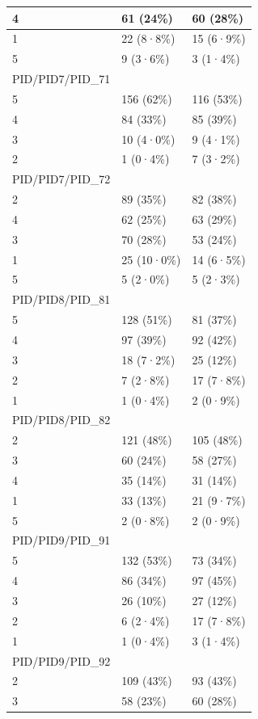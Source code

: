 \documentclass[
]{book}
\begin{document}
\begin{tabular}{l|l|l}
\hline
4 & 61 (24\%) & 60 (28\%)\\
\hline
1 & 22 (8·8\%) & 15 (6·9\%)\\
\hline
5 & 9 (3·6\%) & 3 (1·4\%)\\
\hline
PID/PID7/PID\_71 &  & \\
\hline
5 & 156 (62\%) & 116 (53\%)\\
\hline
4 & 84 (33\%) & 85 (39\%)\\
\hline
3 & 10 (4·0\%) & 9 (4·1\%)\\
\hline
2 & 1 (0·4\%) & 7 (3·2\%)\\
\hline
PID/PID7/PID\_72 &  & \\
\hline
2 & 89 (35\%) & 82 (38\%)\\
\hline
4 & 62 (25\%) & 63 (29\%)\\
\hline
3 & 70 (28\%) & 53 (24\%)\\
\hline
1 & 25 (10·0\%) & 14 (6·5\%)\\
\hline
5 & 5 (2·0\%) & 5 (2·3\%)\\
\hline
PID/PID8/PID\_81 &  & \\
\hline
5 & 128 (51\%) & 81 (37\%)\\
\hline
4 & 97 (39\%) & 92 (42\%)\\
\hline
3 & 18 (7·2\%) & 25 (12\%)\\
\hline
2 & 7 (2·8\%) & 17 (7·8\%)\\
\hline
1 & 1 (0·4\%) & 2 (0·9\%)\\
\hline
PID/PID8/PID\_82 &  & \\
\hline
2 & 121 (48\%) & 105 (48\%)\\
\hline
3 & 60 (24\%) & 58 (27\%)\\
\hline
4 & 35 (14\%) & 31 (14\%)\\
\hline
1 & 33 (13\%) & 21 (9·7\%)\\
\hline
5 & 2 (0·8\%) & 2 (0·9\%)\\
\hline
PID/PID9/PID\_91 &  & \\
\hline
5 & 132 (53\%) & 73 (34\%)\\
\hline
4 & 86 (34\%) & 97 (45\%)\\
\hline
3 & 26 (10\%) & 27 (12\%)\\
\hline
2 & 6 (2·4\%) & 17 (7·8\%)\\
\hline
1 & 1 (0·4\%) & 3 (1·4\%)\\
\hline
PID/PID9/PID\_92 &  & \\
\hline
2 & 109 (43\%) & 93 (43\%)\\
\hline
3 & 58 (23\%) & 60 (28\%)\\

\end{tabular}
\end{document}

